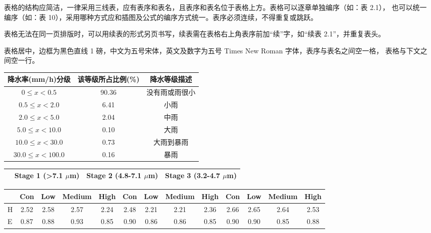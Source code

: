 表格的结构应简洁，一律采用三线表，应有表序和表名，且表序和表名位于表格上方。表格可以逐章单独编序（如：表 2.1），
也可以统一编序（如：表 10），采用哪种方式应和插图及公式的编序方式统一。表序必须连续，不得重复或跳跃。

表格无法在同一页排版时，可以用续表的形式另页书写，续表需在表格右上角表序前加“续”字，如“续表 2.1”，并重复表头。

表格居中，边框为黑色直线 1 磅，中文为五号宋体，英文及数字为五号 Times New Roman 字体，表序与表名之间空一格，
表格与下文之间空一行。

\begin{center}
  {\songti\fontsize{10.5pt}{12.6pt}\selectfont
  \begin{tabular}{cccc}
    \toprule
    降水率(mm/h)分级 & 该等级所占比例(\%) & \multicolumn{2}{c}{降水等级描述} \\
    \midrule
    $0 \le x < 0.5$     & 90.36 & \multicolumn{2}{c}{没有雨或雨很小} \\
    $0.5 \le x < 2.0$   & 6.41  & \multicolumn{2}{c}{小雨} \\
    $2.0 \le x < 5.0$   & 2.04  & \multicolumn{2}{c}{中雨} \\
    $5.0 \le x < 10.0$  & 0.10  & \multicolumn{2}{c}{大雨} \\
    $10.0 \le x < 30.0$ & 0.73  & \multicolumn{2}{c}{大雨到暴雨} \\
    $30.0 \le x < 100.0$ & 0.16 & \multicolumn{2}{c}{暴雨} \\
    \bottomrule
  \end{tabular}
  }
\end{center}

\begin{center}
  {\songti\fontsize{10.5pt}{12.6pt}\selectfont
  \begin{tabular*}{16.48cm}{@{\extracolsep{\fill}}lcccccccccccc}
    \toprule
    & \multicolumn{4}{c}{Stage 1 (>7.1 $\mu$m)} & \multicolumn{4}{c}{Stage 2 (4.8-7.1 $\mu$m)} & \multicolumn{4}{c}{Stage 3 (3.2-4.7 $\mu$m)} \\
    \midrule
  \end{tabular*}
  }
\end{center}

\clearpage
\begin{center}
  {\songti\fontsize{10.5pt}{12.6pt}\selectfont
  \begin{tabular*}{16.48cm}{@{\extracolsep{\fill}}lcccccccccccc}
    \toprule
    & Con & Low & Medium & High & Con & Low & Medium & High & Con & Low & Medium & High \\
    \midrule
    H & 2.52 & 2.58 & 2.57 & 2.24 & 2.48 & 2.21 & 2.21 & 2.36 & 2.66 & 2.65 & 2.64 & 2.53 \\
    E & 0.87 & 0.88 & 0.93 & 0.85 & 0.90 & 0.86 & 0.86 & 0.85 & 0.90 & 0.90 & 0.85 & 0.88 \\
    \bottomrule
  \end{tabular*}
  }
\end{center}

